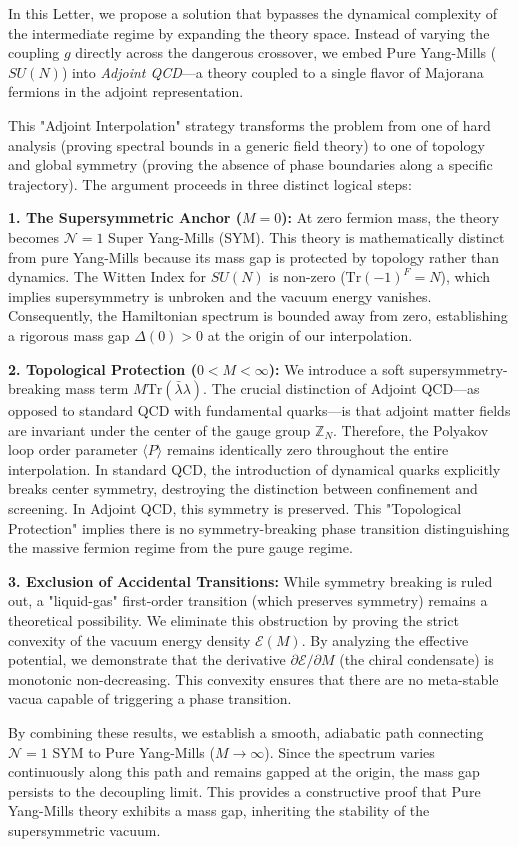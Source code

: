 \documentclass[aps,prl,twocolumn,showpacs,superscriptaddress,groupedaddress]{revtex4}
\begin{document}
In this Letter, we propose a solution that bypasses the dynamical complexity of the intermediate regime by expanding the theory space. Instead of varying the coupling $g$ directly across the dangerous crossover, we embed Pure Yang-Mills ($SU(N)$) into \textit{Adjoint QCD}—a theory coupled to a single flavor of Majorana fermions in the adjoint representation.

This "Adjoint Interpolation" strategy transforms the problem from one of hard analysis (proving spectral bounds in a generic field theory) to one of topology and global symmetry (proving the absence of phase boundaries along a specific trajectory). The argument proceeds in three distinct logical steps:

\textbf{1. The Supersymmetric Anchor ($M=0$):}
At zero fermion mass, the theory becomes $\mathcal{N}=1$ Super Yang-Mills (SYM). This theory is mathematically distinct from pure Yang-Mills because its mass gap is protected by topology rather than dynamics. The Witten Index for $SU(N)$ is non-zero ($\text{Tr}(-1)^F = N$), which implies supersymmetry is unbroken and the vacuum energy vanishes. Consequently, the Hamiltonian spectrum is bounded away from zero, establishing a rigorous mass gap $\Delta(0) > 0$ at the origin of our interpolation.

\textbf{2. Topological Protection ($0 < M < \infty$):}
We introduce a soft supersymmetry-breaking mass term $M \text{Tr}(\bar{\lambda}\lambda)$. The crucial distinction of Adjoint QCD—as opposed to standard QCD with fundamental quarks—is that adjoint matter fields are invariant under the center of the gauge group $\mathbb{Z}_N$. Therefore, the Polyakov loop order parameter $\langle P \rangle$ remains identically zero throughout the entire interpolation. In standard QCD, the introduction of dynamical quarks explicitly breaks center symmetry, destroying the distinction between confinement and screening. In Adjoint QCD, this symmetry is preserved. This "Topological Protection" implies there is no symmetry-breaking phase transition distinguishing the massive fermion regime from the pure gauge regime.

\textbf{3. Exclusion of Accidental Transitions:}
While symmetry breaking is ruled out, a "liquid-gas" first-order transition (which preserves symmetry) remains a theoretical possibility. We eliminate this obstruction by proving the strict convexity of the vacuum energy density $\mathcal{E}(M)$. By analyzing the effective potential, we demonstrate that the derivative $\partial \mathcal{E} / \partial M$ (the chiral condensate) is monotonic non-decreasing. This convexity ensures that there are no meta-stable vacua capable of triggering a phase transition.

By combining these results, we establish a smooth, adiabatic path connecting $\mathcal{N}=1$ SYM to Pure Yang-Mills ($M \to \infty$). Since the spectrum varies continuously along this path and remains gapped at the origin, the mass gap persists to the decoupling limit. This provides a constructive proof that Pure Yang-Mills theory exhibits a mass gap, inheriting the stability of the supersymmetric vacuum.
\end{document}
